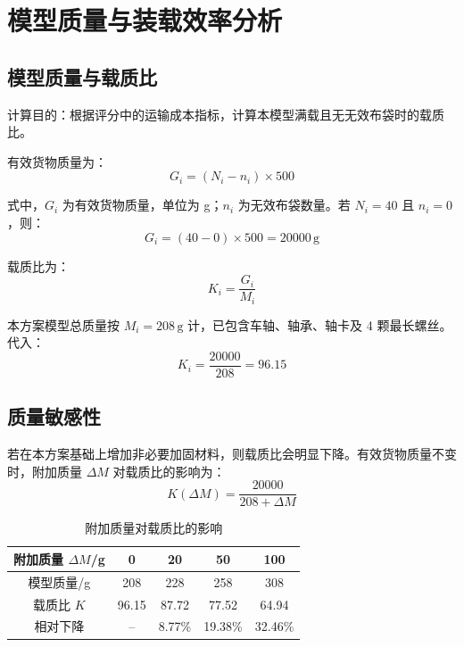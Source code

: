 \documentclass[UTF8,a4paper,12pt,fontset=none]{ctexart}
\numberwithin{equation}{section}
\numberwithin{figure}{section}
\numberwithin{table}{section}
\newcommand{\g}{\,\mathrm{g}}
\begin{document}
\newpage
\section{模型质量与装载效率分析}

\subsection{模型质量与载质比}
计算目的：根据评分中的运输成本指标，计算本模型满载且无无效布袋时的载质比。

有效货物质量为：
\begin{equation}
  G_i=(N_i-n_i)\times500
\end{equation}

式中，$G_i$ 为有效货物质量，单位为 g；$n_i$ 为无效布袋数量。若 $N_i=40$ 且 $n_i=0$，则：
\begin{equation}
  G_i=(40-0)\times500=20000\g
\end{equation}

载质比为：
\begin{equation}
  K_i=\frac{G_i}{M_i}
\end{equation}

本方案模型总质量按 $M_i=208\g$ 计，已包含车轴、轴承、轴卡及 4 颗最长螺丝。代入：
\begin{equation}
  K_i=\frac{20000}{208}=96.15
\end{equation}

\subsection{质量敏感性}
若在本方案基础上增加非必要加固材料，则载质比会明显下降。有效货物质量不变时，附加质量 $\Delta M$ 对载质比的影响为：
\begin{equation}
  K(\Delta M)=\frac{20000}{208+\Delta M}
\end{equation}

\begin{table}[H]
\centering
\caption{附加质量对载质比的影响}
\label{tab:mass-sensitivity}
\begin{tabular}{c c c c c}
\toprule
附加质量 $\Delta M$/g & 0 & 20 & 50 & 100 \\
\midrule
模型质量/g & 208 & 228 & 258 & 308 \\
载质比 $K$ & 96.15 & 87.72 & 77.52 & 64.94 \\
相对下降 & -- & 8.77\% & 19.38\% & 32.46\% \\
\bottomrule
\end{tabular}
\end{table}
\end{document}
